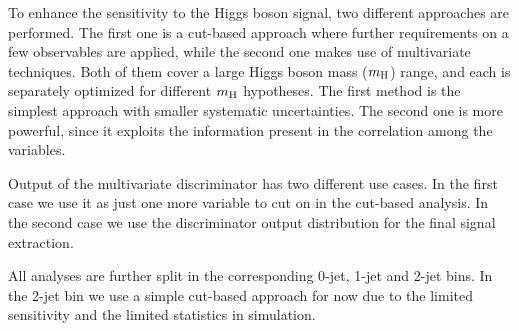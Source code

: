 To enhance the sensitivity to the Higgs boson signal, two different approaches 
are performed. The first one is a cut-based approach where further requirements 
on a few observables are applied, while the second one makes use of
multivariate techniques. Both of them cover a large Higgs boson mass
($m_{\rm{H}}$) range, and each is separately optimized for different
$m_{\rm{H}}$ hypotheses. The first method is the simplest approach with smaller
systematic uncertainties. The second one is
more powerful, since it exploits the information present in the
correlation among the variables. 

Output of the multivariate discriminator has two different use
cases. In the first case we use it as just one more variable to cut on
in the cut-based analysis. In the second case we use the discriminator
output distribution for the final signal extraction.

All analyses are further split in the corresponding 0-jet, 1-jet and
2-jet bins. In the 2-jet bin we use a simple cut-based approach for
now due to the limited sensitivity and the limited statistics in
simulation.

